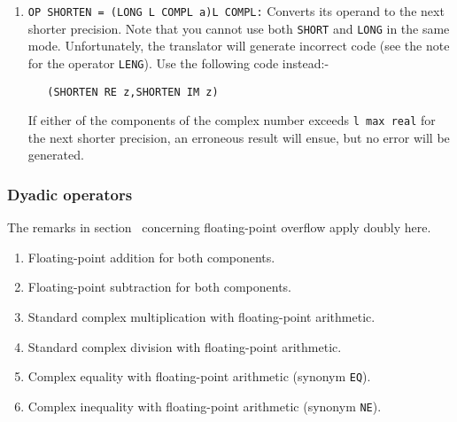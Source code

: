 \begin{enumerate}
\begin{verbatim}
   (LENG RE z,LENG IM z)
\end{verbatim}
\item {} \newline
\verb|OP SHORTEN = (LONG L COMPL a)L COMPL:| \newline
Converts its operand to the next shorter precision. Note that you
cannot use both \verb|SHORT| and \verb|LONG| in the same mode.
Unfortunately, the 
translator will generate incorrect code (see the note for the
operator \verb|LENG|). Use the following code instead:-
\begin{verbatim}
   (SHORTEN RE z,SHORTEN IM z)
\end{verbatim}
\noindent
If either of the components of the complex number exceeds
\verb|l max real| for the next shorter precision, an erroneous result
will ensue, but no error will be generated.
\end{enumerate}

\subsubsection*{Dyadic operators}
The remarks in section~ concerning
floating-point overflow apply doubly here.
\begin{enumerate}
\item {}
\newline
Floating-point addition for both components.
\item {}
\newline
Floating-point subtraction for both components.
\item {} \newline
Standard complex multiplication with floating-point arithmetic.
\item {} \newline
Standard complex division with floating-point arithmetic.
\item {}\newline
Complex equality with floating-point arithmetic (synonym \verb|EQ|).
\item {}\newline
Complex inequality with floating-point arithmetic (synonym \verb|NE|).
\end{enumerate}

